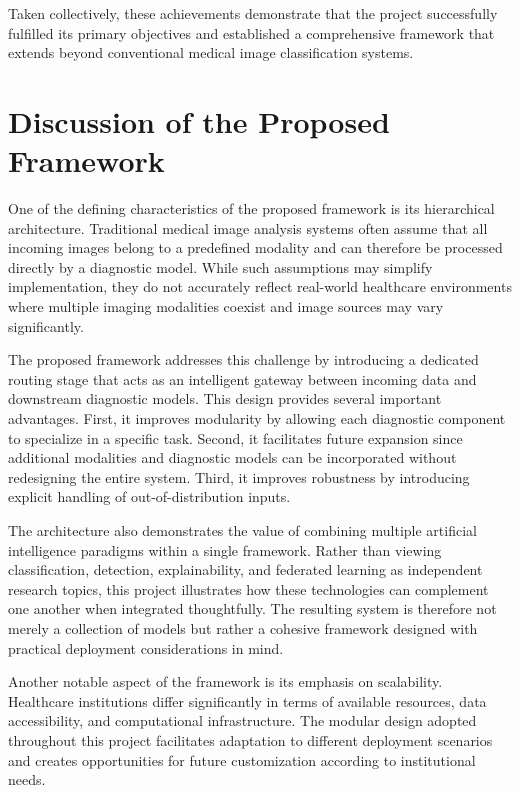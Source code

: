 Taken collectively, these achievements demonstrate that the project successfully fulfilled its primary objectives and established a comprehensive framework that extends beyond conventional medical image classification systems.

\section{Discussion of the Proposed Framework}

One of the defining characteristics of the proposed framework is its hierarchical architecture. Traditional medical image analysis systems often assume that all incoming images belong to a predefined modality and can therefore be processed directly by a diagnostic model. While such assumptions may simplify implementation, they do not accurately reflect real-world healthcare environments where multiple imaging modalities coexist and image sources may vary significantly.

The proposed framework addresses this challenge by introducing a dedicated routing stage that acts as an intelligent gateway between incoming data and downstream diagnostic models. This design provides several important advantages. First, it improves modularity by allowing each diagnostic component to specialize in a specific task. Second, it facilitates future expansion since additional modalities and diagnostic models can be incorporated without redesigning the entire system. Third, it improves robustness by introducing explicit handling of out-of-distribution inputs.

The architecture also demonstrates the value of combining multiple artificial intelligence paradigms within a single framework. Rather than viewing classification, detection, explainability, and federated learning as independent research topics, this project illustrates how these technologies can complement one another when integrated thoughtfully. The resulting system is therefore not merely a collection of models but rather a cohesive framework designed with practical deployment considerations in mind.

Another notable aspect of the framework is its emphasis on scalability. Healthcare institutions differ significantly in terms of available resources, data accessibility, and computational infrastructure. The modular design adopted throughout this project facilitates adaptation to different deployment scenarios and creates opportunities for future customization according to institutional needs.

